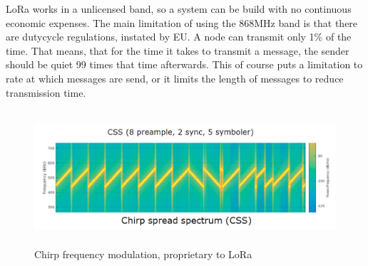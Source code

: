 LoRa works in a unlicensed band, so a system can be build with no continuous economic expenses. The main limitation of using the 868MHz band is that there are dutycycle regulations, instated by EU. A node can transmit only 1\% of the time. That means, that for the time it takes to transmit a message, the sender should be quiet 99 times that time afterwards. This of course puts a limitation to rate at which messages are send, or it limits the length of messages to reduce transmission time.

\begin{figure}[h!]
  \centering
  \includegraphics[height = 5cm]{chirp.png}
  \caption{Chirp frequency modulation, proprietary to LoRa}
  \label{fig:chirp}
\end{figure}
